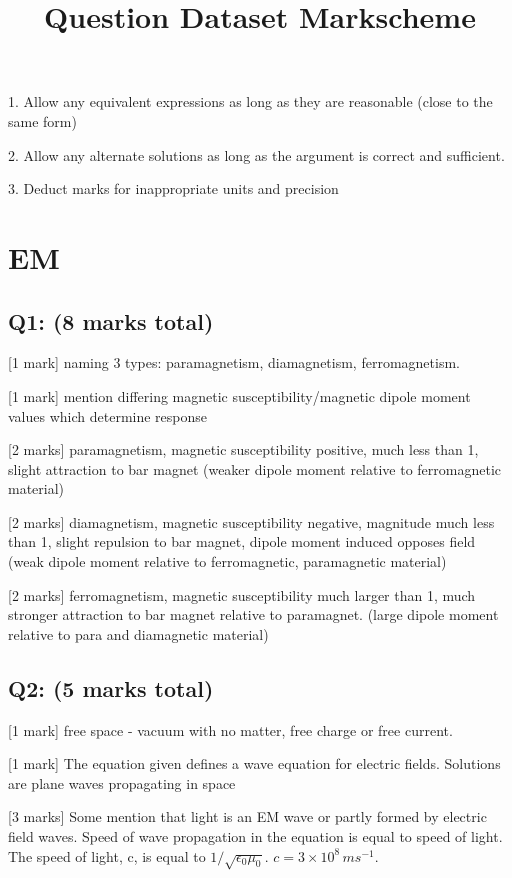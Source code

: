 \documentclass[a4paper,11pt]{article}
\begin{document}
\title{Question Dataset Markscheme}
\author{}
\date{}
\maketitle

1. Allow any equivalent expressions as long as they are reasonable (close to the same form)

2. Allow any alternate solutions as long as the argument is correct and sufficient. 

3. Deduct marks for inappropriate units and precision

\section{EM}

\subsection*{Q1: (8 marks total)}

[1 mark] naming 3 types: paramagnetism, diamagnetism, ferromagnetism. 

[1 mark] mention differing magnetic susceptibility/magnetic dipole moment values which determine response 

[2 marks] paramagnetism, magnetic susceptibility positive, much less than 1, slight attraction to bar magnet (weaker dipole moment relative to ferromagnetic material)

[2 marks] diamagnetism, magnetic susceptibility negative, magnitude much less than 1, slight repulsion to bar magnet, dipole moment induced opposes field (weak dipole moment relative to ferromagnetic, paramagnetic material)

[2 marks] ferromagnetism, magnetic susceptibility much larger than 1, much stronger attraction to bar magnet relative to paramagnet. (large dipole moment relative to para and diamagnetic material)

\subsection*{Q2: (5 marks total)}

[1 mark] free space - vacuum with no matter, free charge or free current.

[1 mark] The equation given defines a wave equation for electric fields. Solutions are plane waves propagating in space

[3 marks] Some mention that light is an EM wave or partly formed by electric field waves. Speed of wave propagation in the equation is equal to speed of light. The speed of light, c,  is equal to \(1/\sqrt{\epsilon_{0}\mu_{0}}\). \(c = 3 \times 10^8 \, ms^{-1}\).
\end{document}
